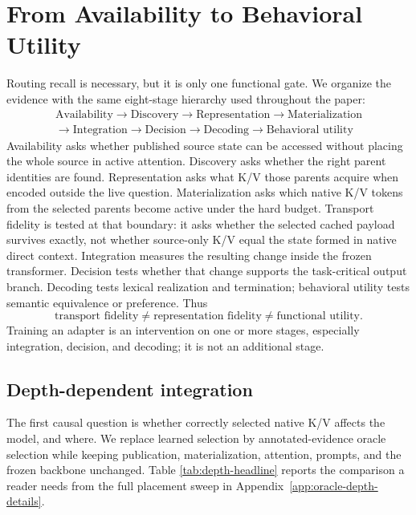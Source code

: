 \documentclass[11pt]{article}
\begin{document}
\section{From Availability to Behavioral Utility}
\label{sec:evaluation-hierarchy}

Routing recall is necessary, but it is only one functional gate. We organize the evidence with the
same eight-stage hierarchy used throughout the paper:
\begin{equation}
\boxed{
\begin{aligned}
\text{Availability}
\rightarrow
\text{Discovery}
\rightarrow
\text{Representation}
\rightarrow
\text{Materialization}
\\[-2pt]
{}
\rightarrow
\text{Integration}
\rightarrow
\text{Decision}
\rightarrow
\text{Decoding}
\rightarrow
\text{Behavioral utility}
\end{aligned}}
\label{eq:evaluation-hierarchy}
\end{equation}
Availability asks whether published source state can be accessed without placing the whole source
in active attention. Discovery asks whether the right parent identities are found. Representation
asks what K/V those parents acquire when encoded outside the live question. Materialization asks
which native K/V tokens from the selected parents become active under the hard budget. Transport
fidelity is tested at that boundary: it asks whether the selected cached payload survives exactly,
not whether source-only K/V equal the state formed in native direct context. Integration measures
the resulting change inside the frozen transformer. Decision tests whether that change supports
the task-critical output branch. Decoding tests lexical realization and termination; behavioral
utility tests semantic equivalence or preference. Thus
\begin{equation}
\boxed{\text{transport fidelity}\neq\text{representation fidelity}\neq\text{functional utility}.}
\end{equation}
Training an adapter is an intervention on one or more stages, especially integration, decision,
and decoding; it is not an additional stage.

\subsection{Depth-dependent integration}

The first causal question is whether correctly selected native K/V affects the model, and where.
We replace learned selection by annotated-evidence oracle selection while keeping publication,
materialization, attention, prompts, and the frozen backbone unchanged.  Table
\ref{tab:depth-headline} reports the comparison a reader needs from the full placement sweep in
Appendix~\ref{app:oracle-depth-details}.
\end{document}
